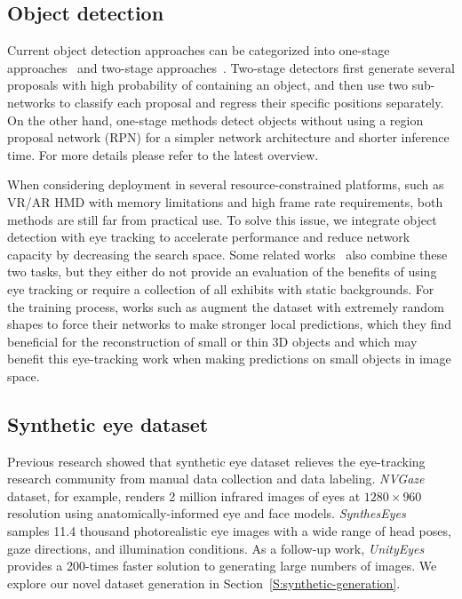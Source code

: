 \subsection{Object detection}

Current object detection approaches can be categorized into one-stage
approaches~\cite{redmon2016you, liu2016ssd, lin2017focal} and two-stage
approaches~\cite{girshick2014rich, girshick2015fast, ren2015faster, he2017mask}.
Two-stage detectors first generate several proposals with high probability of
containing an object, and then use two sub-networks to classify each
proposal and regress their specific positions separately. On the other hand,
one-stage methods detect objects without using a region proposal network (RPN)
for a simpler network architecture and shorter inference time. For more details
please refer to the latest overview\cite{liu2020deep}.

When considering deployment in several resource-constrained platforms, such as
VR/AR HMD with memory limitations and high frame rate requirements, both methods
are still far from practical use. To solve this issue, we integrate object
detection with eye tracking to accelerate performance and reduce network
capacity by decreasing the search space. Some related works~\cite{toyama2012gaze,
ishiguro2010aided, bonino2009blueprint} also combine these two tasks, but they
either do not provide an evaluation of the benefits of using eye tracking or
require a collection of all exhibits with static backgrounds. For the training process, works such as \cite{chabra2020deep} augment the dataset with extremely random shapes to force their networks to make stronger local predictions, which they find beneficial for the reconstruction of small or thin 3D objects and which may benefit this eye-tracking work when making predictions on small objects in image space.
\vspace{-0.5em}

\subsection{Synthetic eye dataset}\label{S:synthetic-dataset}

Previous research showed that synthetic eye dataset relieves the eye-tracking
research community from manual data collection and data labeling.
\emph{NVGaze}~\cite{kim2019nvgaze} dataset, for example, renders 2 million
infrared images of eyes at \(1280 \times 960\) resolution using
anatomically-informed eye and face models.
\emph{SynthesEyes}~\cite{wood2015rendering} samples 11.4 thousand photorealistic
eye images with a wide range of head poses, gaze directions, and illumination
conditions. As a follow-up work, \emph{UnityEyes}~\cite{wood2016learning}
provides a 200-times faster solution to generating large numbers of images. We explore our novel dataset generation in Section~\ref{S:synthetic-generation}.
\vspace{-0.5em}